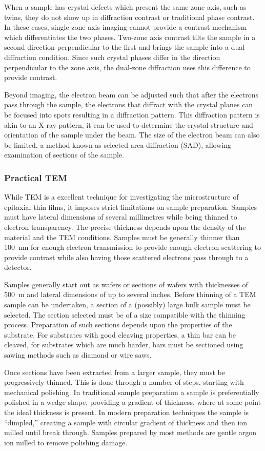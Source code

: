 When a sample has crystal defects which present the same zone axis, such as twins, they do not show up in diffraction contrast or traditional phase contrast.
In these cases, single zone axis imaging cannot provide a contrast mechanism which differentiates the two phases.
Two-zone axis contrast tilts the sample in a second direction perpendicular to the first and brings the sample into a dual-diffraction condition.
Since such crystal phases differ in the direction perpendicular to the zone axis, the dual-zone diffraction uses this difference to provide contrast.

Beyond imaging, the electron beam can be adjusted such that after the electrons pass through the sample, the electrons that diffract with the crystal planes can be focused into spots resulting in a diffraction pattern.
This diffraction pattern is akin to an X-ray pattern, it can be used to determine the crystal structure and orientation of the sample under the beam.
The size of the electron beam can also be limited, a method known as selected area diffraction (SAD), allowing examination of sections of the sample.
\subsubsection{Practical TEM} While TEM is a excellent technique for investigating the microstructure of epitaxial thin films, it imposes strict limitations on sample preparation.
Samples must have lateral dimensions of several millimetres while being thinned to electron transparency.
The precise thickness depends upon the density of the material and the TEM conditions.
Samples must be generally thinner than 100~nm for enough electron transmission to provide enough electron scattering to provide contrast while also having those scattered electrons pass through to a detector.

Samples generally start out as wafers or sections of wafers with thicknesses of 500~\micro{}m and lateral dimensions of up to several inches.
Before thinning of a TEM sample can be undertaken, a section of a (possibly) large bulk sample must be selected.
The section selected must be of a size compatible with the thinning process.
Preparation of such sections depends upon the properties of the substrate.
For substrates with good cleaving properties, a thin bar can be cleaved, for substrates which are much harder, bars must be sectioned using sawing methods such as diamond or wire saws.

Once sections have been extracted from a larger sample, they must be progressively thinned.
This is done through a number of steps, starting with mechanical polishing.
In traditional sample preparation a sample is preferentially polished in a wedge shape, providing a gradient of thickness, where at some point the ideal thickness is present.
In modern preparation techniques the sample is ``dimpled,'' creating a sample with circular gradient of thickness and then ion milled until break through.
Samples prepared by most methods are gentle argon ion milled to remove polishing damage.

